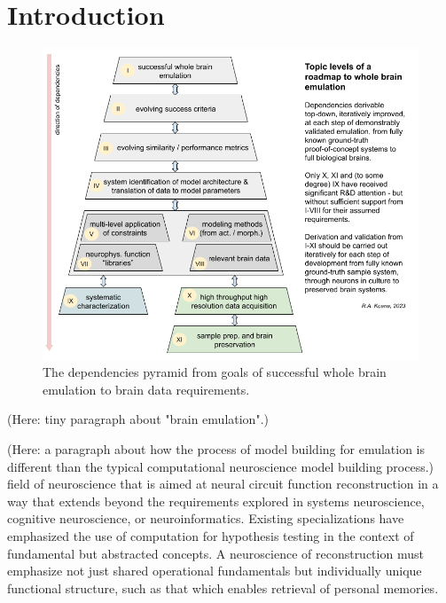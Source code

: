 \documentclass{ldr-article}
\begin{document}
\section{Introduction}

\begin{figure}
    \centering
    \includegraphics[width=1\linewidth]{figures/Deriving-whole-brain-emulation.png}
    \caption{The dependencies pyramid from goals of successful whole brain emulation to brain data requirements.
}
    \label{fig:dependencies-pyramid}
\end{figure}

(Here: tiny paragraph about "brain emulation".)

(Here: a paragraph about how the process of model building for emulation is different than the typical computational neuroscience model building process.)
field of neuroscience that is aimed at neural circuit function reconstruction in a way that extends beyond the requirements explored in systems neuroscience, cognitive neuroscience, or neuroinformatics. Existing specializations have emphasized the use of computation for hypothesis testing in the context of fundamental but abstracted concepts. A neuroscience of reconstruction must emphasize not just shared operational fundamentals but individually unique functional structure, such as that which enables retrieval of personal memories.
\end{document}
